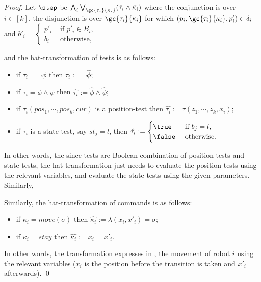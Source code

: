 \begin{proof}
 Let $\step$ be
 $
  \bigwedge_i \bigvee_{\gc{\tau_i}{\kappa_i}} (\hat{\tau_i} \wedge \hat{\kappa_i}) 
 $
where the conjunction is over $i \in [k]$, the disjunction is over $\gc{\tau_i}{\kappa_i}$ for which
$(p_i,\gc{\tau_i}{\kappa_i},p'_i) \in \delta_i$ and 
$b'_i = \begin{cases}
         p'_i & \mbox{ if } p'_i \in B_i,\\
         b_i & \mbox{ otherwise,}
        \end{cases}
$ 

and the hat-transformation of tests is as follows: 
\begin{itemize}
 \item if $\tau_i = \neg \phi$ then $\hat{\tau_i} := \neg \hat{\phi}$;
 \item if $\tau_i = \phi \wedge \psi$ then $\hat{\tau_i} := \hat{\phi} \wedge \hat{\psi}$;
 \item if $\tau_i(pos_1,\cdots,pos_k,cur)$ is a position-test then $\hat{\tau_i} := \tau(z_1,\cdots,z_k,x_i)$;
 \item if $\tau_i$ is a state test, say $st_j = l$, then 
 $\hat{\tau_i} := \begin{cases}
                 \true & \mbox{ if } b_j = l,\\
                 \false & \mbox{ otherwise.}
                \end{cases}
 $
  \end{itemize}              
In other words, the since tests are Boolean combination of position-tests and state-tests, the hat-transformation just needs to evaluate the position-tests using the relevant variables, and evaluate the state-tests using the given parameters. Similarly, 

Similarly, the hat-transformation of commands is as follows: 
\begin{itemize}
  \item if $\kappa_i = move(\sigma)$ then $\hat{\kappa_i} := \lambda(x_i,x'_i) = \sigma$;
  \item if $\kappa_i = stay$ then $\hat{\kappa_i} := x_i = x'_i$.
\end{itemize}
In other words, the transformation expresses in \msol, the movement of robot $i$ using the relevant variables ($x_i$ is the position before the transition is taken and $x'_i$ afterwards). \qed
\end{proof}


